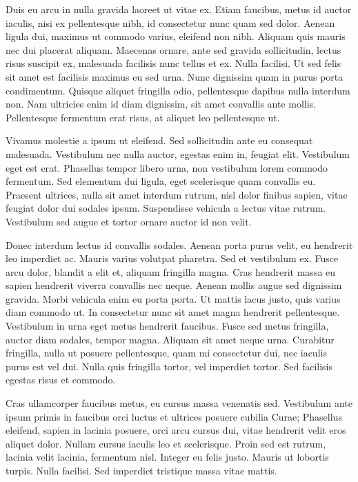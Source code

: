 Duis eu arcu in nulla gravida laoreet ut vitae ex. Etiam faucibus, metus id auctor iaculis, nisi ex pellentesque nibh, id consectetur nunc quam sed dolor. Aenean ligula dui, maximus ut commodo varius, eleifend non nibh. Aliquam quis mauris nec dui placerat aliquam. Maecenas ornare, ante sed gravida sollicitudin, lectus risus suscipit ex, malesuada facilisis nunc tellus et ex. Nulla facilisi. Ut sed felis sit amet est facilisis maximus eu sed urna. Nunc dignissim quam in purus porta condimentum. Quisque aliquet fringilla odio, pellentesque dapibus nulla interdum non. Nam ultricies enim id diam dignissim, sit amet convallis ante mollis. Pellentesque fermentum erat risus, at aliquet leo pellentesque ut.

Vivamus molestie a ipsum ut eleifend. Sed sollicitudin ante eu consequat malesuada. Vestibulum nec nulla auctor, egestas enim in, feugiat elit. Vestibulum eget est erat. Phasellus tempor libero urna, non vestibulum lorem commodo fermentum. Sed elementum dui ligula, eget scelerisque quam convallis eu. Praesent ultrices, nulla sit amet interdum rutrum, nisl dolor finibus sapien, vitae feugiat dolor dui sodales ipsum. Suspendisse vehicula a lectus vitae rutrum. Vestibulum sed augue et tortor ornare auctor id non velit.

Donec interdum lectus id convallis sodales. Aenean porta purus velit, eu hendrerit leo imperdiet ac. Mauris varius volutpat pharetra. Sed et vestibulum ex. Fusce arcu dolor, blandit a elit et, aliquam fringilla magna. Cras hendrerit massa eu sapien hendrerit viverra convallis nec neque. Aenean mollis augue sed dignissim gravida. Morbi vehicula enim eu porta porta. Ut mattis lacus justo, quis varius diam commodo ut. In consectetur nunc sit amet magna hendrerit pellentesque. Vestibulum in urna eget metus hendrerit faucibus. Fusce sed metus fringilla, auctor diam sodales, tempor magna. Aliquam sit amet neque urna. Curabitur fringilla, nulla ut posuere pellentesque, quam mi consectetur dui, nec iaculis purus est vel dui. Nulla quis fringilla tortor, vel imperdiet tortor. Sed facilisis egestas risus et commodo.

Cras ullamcorper faucibus metus, eu cursus massa venenatis sed. Vestibulum ante ipsum primis in faucibus orci luctus et ultrices posuere cubilia Curae; Phasellus eleifend, sapien in lacinia posuere, orci arcu cursus dui, vitae hendrerit velit eros aliquet dolor. Nullam cursus iaculis leo et scelerisque. Proin sed est rutrum, lacinia velit lacinia, fermentum nisl. Integer eu felis justo. Mauris ut lobortis turpis. Nulla facilisi. Sed imperdiet tristique massa vitae mattis.